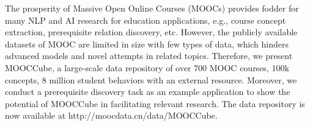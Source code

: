 The prosperity of Massive Open Online Courses (MOOCs) provides fodder for many NLP and AI research for education applications, e.g., course concept extraction, prerequisite relation discovery, etc. However, the publicly available datasets of MOOC are limited in size with few types of data, which hinders advanced models and novel attempts in related topics. Therefore, we present MOOCCube, a large-scale data repository of over 700 MOOC courses, 100k concepts, 8 million student behaviors with an external resource. Moreover, we conduct a prerequisite discovery task as an example application to show the potential of MOOCCube in facilitating relevant research. The data repository is now available at http://moocdata.cn/data/MOOCCube.
